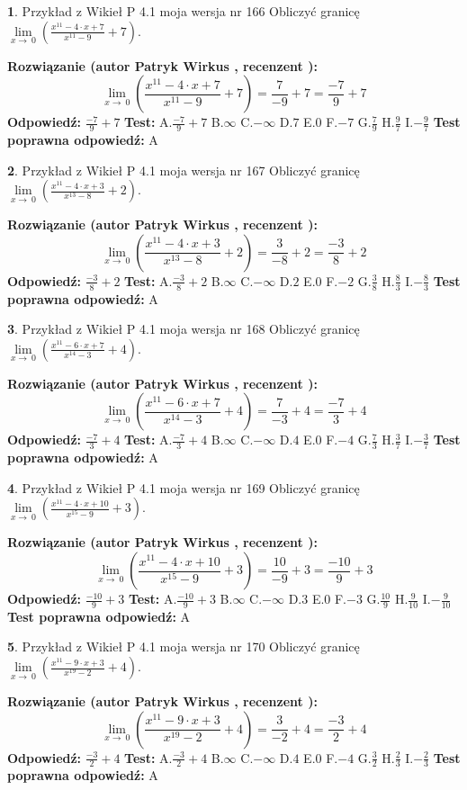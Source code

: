 \documentclass[12pt, a4paper]{article}
\theoremstyle{definition} %
\newtheorem{zad}{}
\newcommand{\zadStart}[1]{\begin{zad}#1\newline}
\newcommand{\zadStop}{\end{zad}}
\newcommand{\rozwStart}[2]{\noindent \textbf{Rozwiązanie (autor #1 , recenzent #2): }\newline}
\newcommand{\rozwStop}{\newline}
\newcommand{\odpStart}{\noindent \textbf{Odpowiedź:}\newline}
\newcommand{\odpStop}{\newline}
\newcommand{\testStart}{\noindent \textbf{Test:}\newline}
\newcommand{\testStop}{\newline}
\newcommand{\kluczStart}{\noindent \textbf{Test poprawna odpowiedź:}\newline}
\newcommand{\kluczStop}{\newline}
\begin{document}
\zadStart{Przykład z Wikieł P 4.1 moja wersja nr 166}
Obliczyć granicę $\lim\limits_{x\to\ 0}(\frac{x^{11}-4 \cdot x +7}{x^{11}-9}+7)$.
\zadStop
\rozwStart{Patryk Wirkus}{}
$$\lim\limits_{x\to\ 0}(\frac{x^{11}-4 \cdot x +7}{x^{11}-9}+7)=\frac{7}{-9}+7=\frac{-7}{9}+7$$
\rozwStop
\odpStart
$\frac{-7}{9}+7$
\odpStop
\testStart
A.$\frac{-7}{9}+7$
B.$\infty$
C.$-\infty$
D.$7$
E.$0$
F.$-7$
G.$\frac{7}{9}$
H.$\frac{9}{7}$
I.$-\frac{9}{7}$
\testStop
\kluczStart
A
\kluczStop



\zadStart{Przykład z Wikieł P 4.1 moja wersja nr 167}
Obliczyć granicę $\lim\limits_{x\to\ 0}(\frac{x^{11}-4 \cdot x +3}{x^{13}-8}+2)$.
\zadStop
\rozwStart{Patryk Wirkus}{}
$$\lim\limits_{x\to\ 0}(\frac{x^{11}-4 \cdot x +3}{x^{13}-8}+2)=\frac{3}{-8}+2=\frac{-3}{8}+2$$
\rozwStop
\odpStart
$\frac{-3}{8}+2$
\odpStop
\testStart
A.$\frac{-3}{8}+2$
B.$\infty$
C.$-\infty$
D.$2$
E.$0$
F.$-2$
G.$\frac{3}{8}$
H.$\frac{8}{3}$
I.$-\frac{8}{3}$
\testStop
\kluczStart
A
\kluczStop



\zadStart{Przykład z Wikieł P 4.1 moja wersja nr 168}
Obliczyć granicę $\lim\limits_{x\to\ 0}(\frac{x^{11}-6 \cdot x +7}{x^{14}-3}+4)$.
\zadStop
\rozwStart{Patryk Wirkus}{}
$$\lim\limits_{x\to\ 0}(\frac{x^{11}-6 \cdot x +7}{x^{14}-3}+4)=\frac{7}{-3}+4=\frac{-7}{3}+4$$
\rozwStop
\odpStart
$\frac{-7}{3}+4$
\odpStop
\testStart
A.$\frac{-7}{3}+4$
B.$\infty$
C.$-\infty$
D.$4$
E.$0$
F.$-4$
G.$\frac{7}{3}$
H.$\frac{3}{7}$
I.$-\frac{3}{7}$
\testStop
\kluczStart
A
\kluczStop



\zadStart{Przykład z Wikieł P 4.1 moja wersja nr 169}
Obliczyć granicę $\lim\limits_{x\to\ 0}(\frac{x^{11}-4 \cdot x +10}{x^{15}-9}+3)$.
\zadStop
\rozwStart{Patryk Wirkus}{}
$$\lim\limits_{x\to\ 0}(\frac{x^{11}-4 \cdot x +10}{x^{15}-9}+3)=\frac{10}{-9}+3=\frac{-10}{9}+3$$
\rozwStop
\odpStart
$\frac{-10}{9}+3$
\odpStop
\testStart
A.$\frac{-10}{9}+3$
B.$\infty$
C.$-\infty$
D.$3$
E.$0$
F.$-3$
G.$\frac{10}{9}$
H.$\frac{9}{10}$
I.$-\frac{9}{10}$
\testStop
\kluczStart
A
\kluczStop



\zadStart{Przykład z Wikieł P 4.1 moja wersja nr 170}
Obliczyć granicę $\lim\limits_{x\to\ 0}(\frac{x^{11}-9 \cdot x +3}{x^{19}-2}+4)$.
\zadStop
\rozwStart{Patryk Wirkus}{}
$$\lim\limits_{x\to\ 0}(\frac{x^{11}-9 \cdot x +3}{x^{19}-2}+4)=\frac{3}{-2}+4=\frac{-3}{2}+4$$
\rozwStop
\odpStart
$\frac{-3}{2}+4$
\odpStop
\testStart
A.$\frac{-3}{2}+4$
B.$\infty$
C.$-\infty$
D.$4$
E.$0$
F.$-4$
G.$\frac{3}{2}$
H.$\frac{2}{3}$
I.$-\frac{2}{3}$
\testStop
\kluczStart
A
\kluczStop
\end{document}
